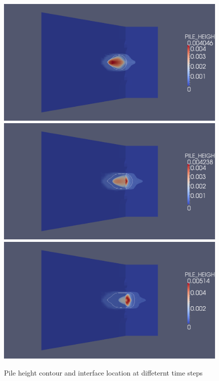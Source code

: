 \documentclass[letterpaper,10pt]{article}
\begin{document}
\begin{figure}[H]
\begin{minipage}[b]{.5\linewidth}
  \end{minipage}
  \begin{minipage}[b]{.5\linewidth}
    \centering
    \includegraphics[width=1\textwidth]{IMAGES/level_set/4.png}
    \includegraphics[width=1\textwidth]{IMAGES/level_set/5.png}
    \includegraphics[width=1\textwidth]{IMAGES/level_set/6.png}
  \end{minipage}
  \caption{Pile height contour and interface location at diffeternt time steps}
  \label{level_set1}
\end{figure}
\end{document}
